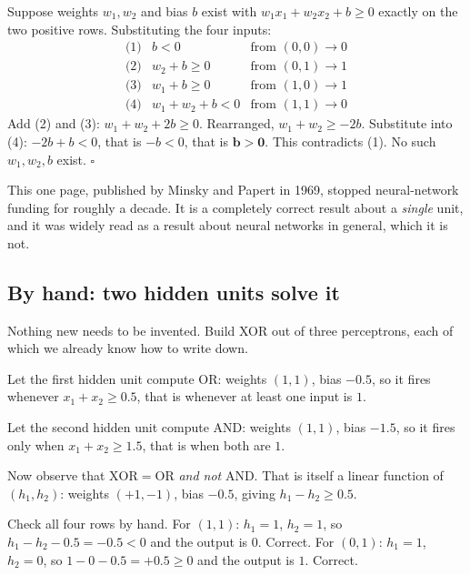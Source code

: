 \documentclass[11pt]{article}
\begin{document}
\begin{worked}
Suppose weights $w_1, w_2$ and bias $b$ exist with
$w_1x_1 + w_2x_2 + b \ge 0$ exactly on the two positive rows. Substituting the
four inputs:
\[
  \begin{array}{lll}
    \text{(1)} & b < 0 & \text{from } (0,0) \to 0\\
    \text{(2)} & w_2 + b \ge 0 & \text{from } (0,1) \to 1\\
    \text{(3)} & w_1 + b \ge 0 & \text{from } (1,0) \to 1\\
    \text{(4)} & w_1 + w_2 + b < 0 & \text{from } (1,1) \to 0
  \end{array}
\]
Add (2) and (3): $w_1 + w_2 + 2b \ge 0$. Rearranged, $w_1 + w_2 \ge -2b$.
Substitute into (4): $-2b + b < 0$, that is $-b < 0$, that is
$\mathbf{b > 0}$. This contradicts (1). No such $w_1, w_2, b$ exist.
\ensuremath{\square}
\end{worked}

This one page, published by Minsky and Papert in 1969, stopped
neural-network funding for roughly a decade. It is a completely correct
result about a \emph{single} unit, and it was widely read as a result about
neural networks in general, which it is not.

\subsection{By hand: two hidden units solve it}
\label{sec:xorhand}

Nothing new needs to be invented. Build XOR out of three perceptrons, each of
which we already know how to write down.

\begin{worked}
Let the first hidden unit compute $\mathrm{OR}$: weights $(1,1)$, bias
$-0.5$, so it fires whenever $x_1 + x_2 \ge 0.5$, that is whenever at least
one input is $1$.

Let the second hidden unit compute $\mathrm{AND}$: weights $(1,1)$, bias
$-1.5$, so it fires only when $x_1 + x_2 \ge 1.5$, that is when both are $1$.

Now observe that $\mathrm{XOR} = \mathrm{OR}$ \emph{and not} $\mathrm{AND}$.
That is itself a linear function of $(h_1, h_2)$: weights $(+1, -1)$, bias
$-0.5$, giving $h_1 - h_2 \ge 0.5$.

Check all four rows by hand. For $(1,1)$: $h_1 = 1$, $h_2 = 1$, so
$h_1 - h_2 - 0.5 = -0.5 < 0$ and the output is $0$. Correct. For $(0,1)$:
$h_1 = 1$, $h_2 = 0$, so $1 - 0 - 0.5 = +0.5 \ge 0$ and the output is $1$.
Correct.
\end{worked}
\end{document}
